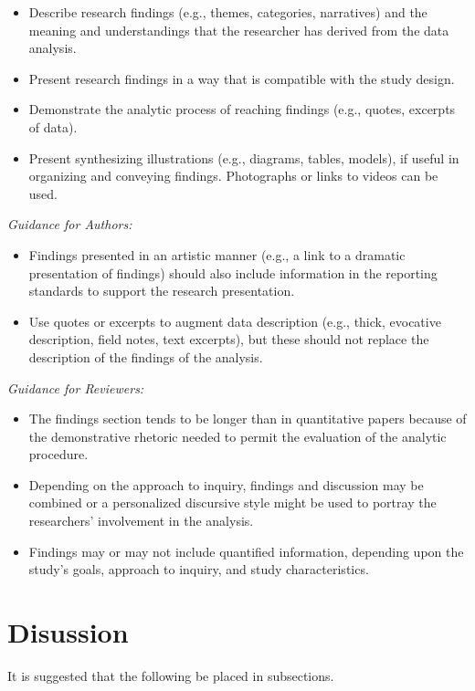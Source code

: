 \documentclass[acmsmall]{acmart}
\begin{document}
\begin{itemize}
    \item Describe research findings (e.g., themes, categories, narratives) and the meaning and understandings that the researcher has derived from the data analysis.
    \item Present research findings in a way that is compatible with the study design.
    \item Demonstrate the analytic process of reaching findings (e.g., quotes, excerpts of data).
    \item Present synthesizing illustrations (e.g., diagrams, tables, models), if useful in organizing and conveying findings. Photographs or links to videos can be used.
\end{itemize}

\textit{Guidance for Authors:}
\begin{itemize}
    \item Findings presented in an artistic manner (e.g., a link to a dramatic presentation of findings) should also include information in the reporting standards to support the research presentation.
    \item Use quotes or excerpts to augment data description (e.g., thick, evocative description,
    field notes, text excerpts), but these should not replace the description of the findings of the analysis.
\end{itemize}

\textit{Guidance for Reviewers:}

\begin{itemize}
    \item The findings section tends to be longer than in quantitative papers because of the demonstrative rhetoric needed to permit the evaluation of the analytic procedure.
    \item Depending on the approach to inquiry, findings and discussion may be combined or a personalized discursive style might be used to portray the researchers’ involvement in the analysis.
    \item Findings may or may not include quantified information, depending upon the study’s goals, approach to inquiry, and study characteristics.
\end{itemize}

\section{Disussion}

It is suggested that the following be placed in subsections.
\end{document}
